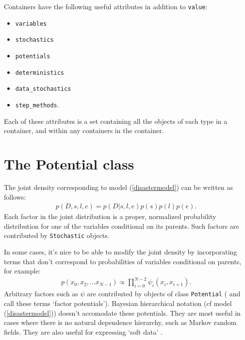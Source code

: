 Containers have the following useful attributes in addition to \texttt{value}:
\begin{itemize}
    \item\texttt{variables}
    \item\texttt{stochastics}
    \item\texttt{potentials}
    \item\texttt{deterministics}
    \item\texttt{data_stochastics}
    \item\texttt{step_methods}.
\end{itemize}
Each of these attributes is a set containing all the objects of each type in a container, and within any containers in the container.


\hypertarget{potential}{}
\section*{The Potential class} \label{potential}

% 

The joint density corresponding to model (\ref{disastermodel}) can be written as follows:
\begin{eqnarray*}
    p(D,s,l,e) = p(D|s,l,e) p(s) p(l) p(e).
\end{eqnarray*}
Each factor in the joint distribution is a proper, normalized probability distribution for one of the variables conditional on its parents. Such factors are contributed by \texttt{Stochastic} objects.

In some cases, it's nice to be able to modify the joint density by incorporating terms that don't correspond to probabilities of variables conditional on parents, for example:
\begin{eqnarray*}
    p(x_0, x_2, \ldots x_{N-1}) \propto \prod_{i=0}^{N-2} \psi_i(x_i, x_{i+1}).
\end{eqnarray*}
Arbitrary factors such as $\psi$ are contributed by objects of class \texttt{Potential} (\cite{dawidmarkov} and \cite{Jordan:2004p5439} call these terms `factor potentials'). Bayesian hierarchical notation (cf model (\ref{disastermodel})) doesn't accomodate these potentials. They are most useful in cases where there is no natural dependence hierarchy, such as Markov random fields. They are also useful for expressing `soft data' \citep{Christakos:2002p5506}.

